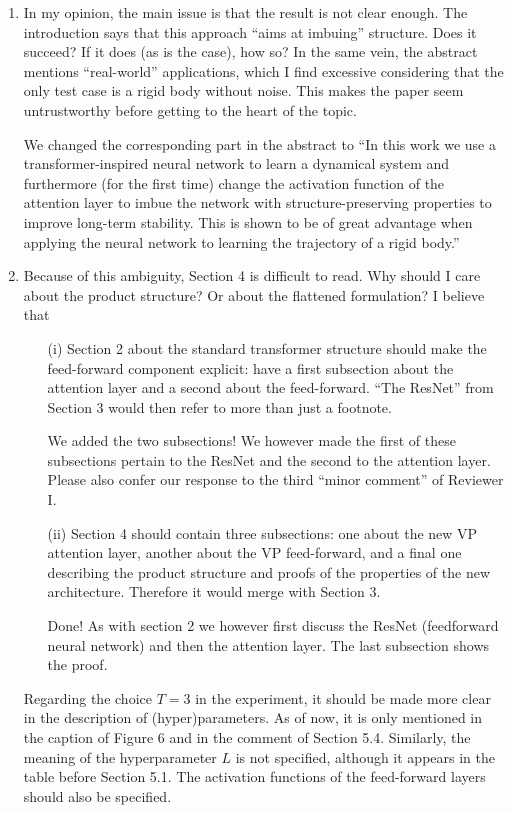 \documentclass{article}
\begin{document}
\begin{enumerate}
    \item In my opinion, the main issue is that the result is not clear enough. The introduction says that this approach ``aims at imbuing'' structure. Does it succeed? If it does (as is the case), how so? In the same vein, the abstract mentions ``real-world'' applications, which I find excessive considering that the only test case is a rigid body without noise. This makes the paper seem untrustworthy before getting to the heart of the topic.
    
    {\color{mred} We changed the corresponding part in the abstract to ``In this work we use a transformer-inspired neural network to learn a dynamical system and furthermore (for the first time) change the activation function of the attention layer to imbue the network with structure-preserving properties to improve long-term stability. This is shown to be of great advantage when applying the neural network to learning the trajectory of a rigid body.''}

    \item Because of this ambiguity, Section 4 is difficult to read. Why should I care about the product structure? Or about the flattened formulation? I believe that 
    \begin{enumerate} 
    \item[(i)] Section 2 about the standard transformer structure should make the feed-forward component explicit: have a first subsection about the attention layer and a second about the feed-forward. ``The ResNet'' from Section 3 would then refer to more than just a footnote.
    
    {\color{mred} We added the two subsections! We however made the first of these subsections pertain to the ResNet and the second to the attention layer. Please also confer our response to the third ``minor comment'' of Reviewer I.}
    \item[(ii)] Section 4 should contain three subsections: one about the new VP attention layer, another about the VP feed-forward, and a final one describing the product structure and proofs of the properties of the new architecture. Therefore it would merge with Section 3.
    
    {\color{mred} Done! As with section 2 we however first discuss the ResNet (feedforward neural network) and then the attention layer. The last subsection shows the proof.}
    \end{enumerate}
    Regarding the choice $T = 3$ in the experiment, it should be made more clear in the description of (hyper)parameters. As of now, it is only mentioned in the caption of Figure 6 and in the comment of Section 5.4. Similarly, the meaning of the hyperparameter $L$ is not specified, although it appears in the table before Section 5.1. The activation functions of the feed-forward layers should also be specified.


\end{enumerate}
\end{document}

